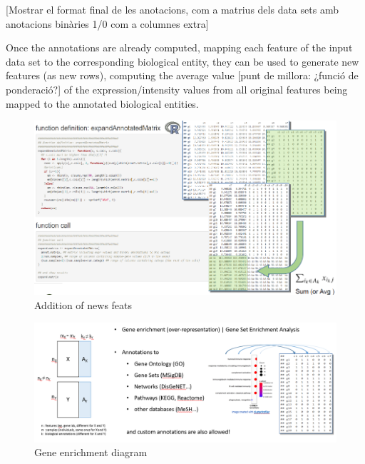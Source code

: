 \documentclass[a4paper, nobind]{templates/ociamthesis}
\begin{document}
{[}Mostrar el format final de les anotacions, com a matrius dels data sets amb anotacions binàries 1/0 com a columnes extra{]}

Once the annotations are already computed, mapping each feature of the input data set to the corresponding biological entity, they can be used to generate new features (as new rows), computing the average value {[}punt de millora: ¿funció de ponderació?{]} of the expression/intensity values from all original features being mapped to the annotated biological entities.

\begin{figure}

{\centering \includegraphics[width=0.95\linewidth]{figures/chapter3/3-2_addition_of_new_feats} 

}

\caption{Addition of news feats}\label{fig:fig3-2}
\end{figure}

\begin{figure}

{\centering \includegraphics[width=0.95\linewidth]{figures/chapter3/3-3_gene_enrichment_diagram} 

}

\caption{Gene enrichment diagram}\label{fig:fig3-3}
\end{figure}
\end{document}

